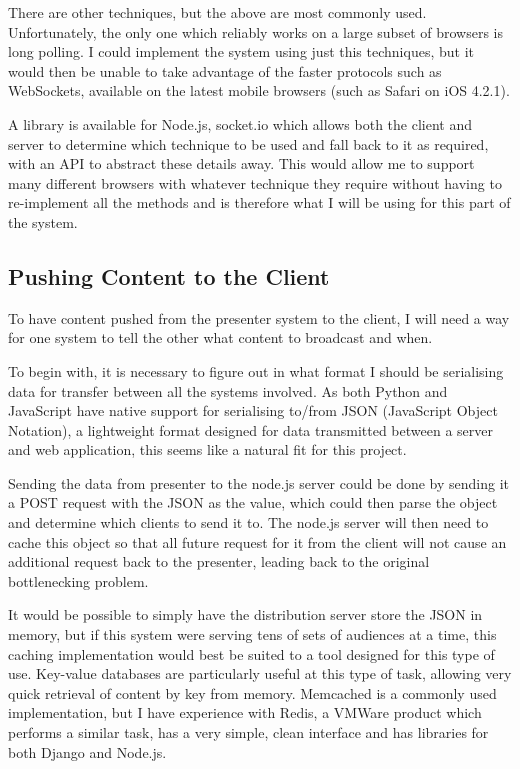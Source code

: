 \documentclass[a4papert,11pt,notitlepage]{ltxdoc}
\begin{document}
There are other techniques, but the above are most commonly used. Unfortunately, the only one which reliably works on a large subset of browsers is long polling. I could implement the system using just this techniques, but it would then be unable to take advantage of the faster protocols such as WebSockets, available on the latest mobile browsers (such as Safari on iOS 4.2.1).

A library is available for Node.js, socket.io which allows both the client and server to determine which technique to be used and fall back to it as required, with an API to abstract these details away. This would allow me to support many different browsers with whatever technique they require without having to re-implement all the methods and is therefore what I will be using for this part of the system.

\subsection{Pushing Content to the Client}
To have content pushed from the presenter system to the client, I will need a way for one system to tell the other what content to broadcast and when. 

To begin with, it is necessary to figure out in what format I should be serialising data for transfer between all the systems involved. As both Python and JavaScript have native support for serialising to/from JSON (JavaScript Object Notation), a lightweight format designed for data transmitted between a server and web application, this seems like a natural fit for this project.

Sending the data from presenter to the node.js server could be done by sending it a POST request with the JSON as the value, which could then parse the object and determine which clients to send it to. The node.js server will then need to cache this object so that all future request for it from the client will not cause an additional request back to the presenter, leading back to the original bottlenecking problem.

It would be possible to simply have the distribution server store the JSON in memory, but if this system were serving tens of sets of audiences at a time, this caching implementation would best be suited to a tool designed for this type of use. Key-value databases are particularly useful at this type of task, allowing very quick retrieval of content by key from memory. Memcached is a commonly used implementation, but I have experience with Redis, a VMWare product which performs a similar task, has a very simple, clean interface and has libraries for both Django and Node.js.
\end{document}
